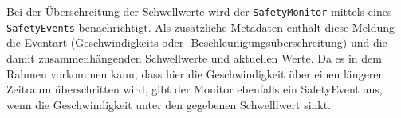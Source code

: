 \noindent
Bei der Überschreitung der Schwellwerte wird der \texttt{SafetyMonitor}
mittels eines \texttt{SafetyEvents} benachrichtigt. Als zusätzliche Metadaten enthält
diese Meldung die Eventart (Geschwindigkeits oder
-Beschleunigungsüberschreitung) und die damit zusammenhängenden Schwellwerte und
aktuellen Werte. Da es in dem Rahmen vorkommen kann, dass hier die
Geschwindigkeit über einen längeren Zeitraum überschritten wird, gibt der
Monitor ebenfalls ein SafetyEvent aus, wenn die Geschwindigkeit unter den
gegebenen Schwelllwert sinkt.
